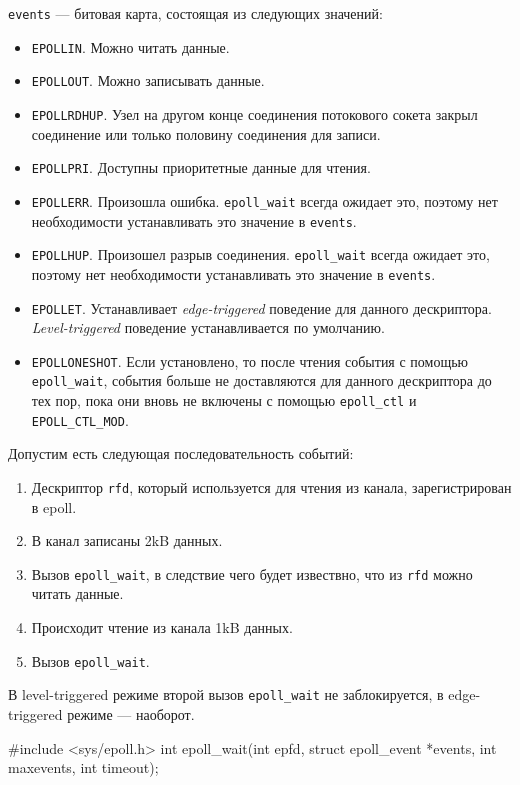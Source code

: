 \lstinline{events} — битовая карта, состоящая из следующих значений:
\begin{itemize}
  \item \lstinline{EPOLLIN}. Можно читать данные.
  \item \lstinline{EPOLLOUT}. Можно записывать данные.
  \item \lstinline{EPOLLRDHUP}. Узел на другом конце соединения потокового сокета закрыл соединение или только половину соединения для записи.
  \item \lstinline{EPOLLPRI}. Доступны приоритетные данные для чтения.
  \item \lstinline{EPOLLERR}. Произошла ошибка. \lstinline{epoll_wait} всегда ожидает это, поэтому нет необходимости устанавливать это значение в \lstinline{events}.
  \item \lstinline{EPOLLHUP}. Произошел разрыв соединения. \lstinline{epoll_wait} всегда ожидает это, поэтому нет необходимости устанавливать это значение в \lstinline{events}.
  \item \lstinline{EPOLLET}. Устанавливает \emph{edge-triggered} поведение для данного дескриптора. \emph{Level-triggered} поведение устанавливается по умолчанию.
  \item \lstinline{EPOLLONESHOT}. Если установлено, то после чтения события с помощью \lstinline{epoll_wait}, события больше не доставляются для данного дескриптора до тех пор, пока они вновь не включены с помощью \lstinline{epoll_ctl} и \lstinline{EPOLL_CTL_MOD}.
\end{itemize}

Допустим есть следующая последовательность событий:
\begin{enumerate}
  \item Дескриптор \lstinline{rfd}, который используется для чтения из канала, зарегистрирован в epoll.
  \item В канал записаны 2kB данных.
  \item Вызов \lstinline{epoll_wait}, в следствие чего будет извествно, что из \lstinline{rfd} можно читать данные.
  \item Происходит чтение из канала 1kB данных.
  \item Вызов \lstinline{epoll_wait}.
\end{enumerate}

В level-triggered режиме второй вызов \lstinline{epoll_wait} не заблокируется, в edge-triggered режиме --- наоборот.

\begin{clst}{}{}
#include <sys/epoll.h>
int epoll_wait(int epfd, struct epoll_event *events,
               int maxevents, int timeout);
\end{clst}

